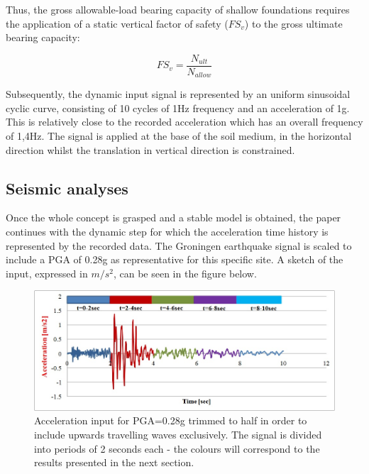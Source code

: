	Thus, the gross allowable-load bearing capacity of shallow foundations requires the application of a static vertical factor of safety ($FS_v$) to the gross ultimate bearing capacity:
	
\begin{equation}
	FS_v=\frac{N_{ult}}{N_{allow}}
\end{equation}

Subsequently, the dynamic input signal is represented by an uniform sinusoidal cyclic curve, consisting of 10 cycles of 1Hz frequency and an acceleration of 1g. This is relatively close to the recorded acceleration which has an overall frequency of 1,4Hz. The signal is applied at the base of the soil medium, in the horizontal direction whilst the translation in vertical direction is constrained.

	  
\subsection{Seismic analyses}	 
Once the whole concept is grasped and a stable model is obtained, the paper \mbox{continues} with the dynamic step for which the acceleration time history is represented by the recorded data. The Groningen earthquake signal is scaled to include a PGA of 0.28g as representative for this specific site. A sketch of the input, expressed in $m/s^2$, can be seen in the figure below.
	
	\begin{figure}[!h]
		\centering
		\includegraphics[width=0.7\linewidth]{"input_acc"}
		\caption{Acceleration input for PGA=0.28g trimmed to half in order to include upwards travelling waves exclusively. The signal is divided into periods of 2 seconds each - the colours will correspond to the results presented in the next section.}
		\label{inputacc}
	\end{figure}
\pagebreak

